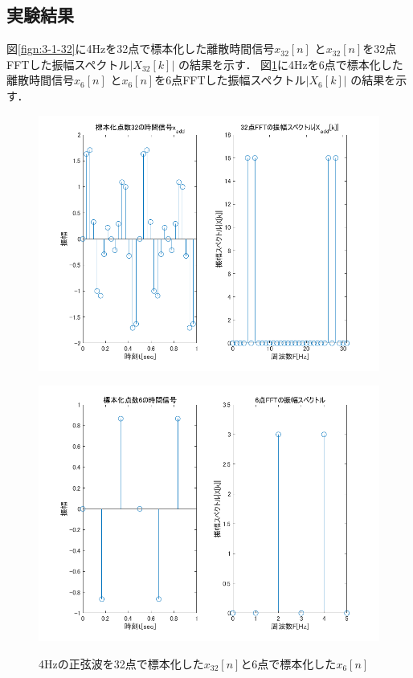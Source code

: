 \documentclass[11pt, a4paper, titlepage]{ltjsarticle}
\begin{document}
\subsection*{実験結果}
図\ref*{fign:3-1-32}に4Hzを32点で標本化した離散時間信号$x_{32}[n]$
と$x_{32}[n]$を32点FFTした振幅スペクトル$|X_{32}[k]|$
の結果を示す．
図\ref*{fign:3-1-6}に4Hzを6点で標本化した離散時間信号$x_{6}[n]$
と$x_{6}[n]$を6点FFTした振幅スペクトル$|X_{6}[k]|$
の結果を示す．
\begin{figure}[h]
    \begin{center}
    \begin{minipage}[t]{0.48\columnwidth}
        \includegraphics[width=\columnwidth]{figures/3-1-32.png}
        \label{fign:3-1-32}
    \end{minipage}
    \begin{minipage}[t]{0.48\columnwidth}
        \includegraphics[width=\columnwidth]{figures/3-1-6.png}
        \label{fign:3-1-6}
    \end{minipage}
    \end{center}
    \caption{4Hzの正弦波を32点で標本化した$x_{32}[n]$と6点で標本化した$x_{6}[n]$}
\end{figure}
\end{document}
